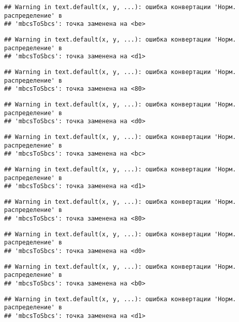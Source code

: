 \documentclass[
]{article}
\begin{document}
\begin{verbatim}
## Warning in text.default(x, y, ...): ошибка конвертации 'Норм. распределение' в
## 'mbcsToSbcs': точка заменена на <be>
\end{verbatim}

\begin{verbatim}
## Warning in text.default(x, y, ...): ошибка конвертации 'Норм. распределение' в
## 'mbcsToSbcs': точка заменена на <d1>
\end{verbatim}

\begin{verbatim}
## Warning in text.default(x, y, ...): ошибка конвертации 'Норм. распределение' в
## 'mbcsToSbcs': точка заменена на <80>
\end{verbatim}

\begin{verbatim}
## Warning in text.default(x, y, ...): ошибка конвертации 'Норм. распределение' в
## 'mbcsToSbcs': точка заменена на <d0>
\end{verbatim}

\begin{verbatim}
## Warning in text.default(x, y, ...): ошибка конвертации 'Норм. распределение' в
## 'mbcsToSbcs': точка заменена на <bc>
\end{verbatim}

\begin{verbatim}
## Warning in text.default(x, y, ...): ошибка конвертации 'Норм. распределение' в
## 'mbcsToSbcs': точка заменена на <d1>
\end{verbatim}

\begin{verbatim}
## Warning in text.default(x, y, ...): ошибка конвертации 'Норм. распределение' в
## 'mbcsToSbcs': точка заменена на <80>
\end{verbatim}

\begin{verbatim}
## Warning in text.default(x, y, ...): ошибка конвертации 'Норм. распределение' в
## 'mbcsToSbcs': точка заменена на <d0>
\end{verbatim}

\begin{verbatim}
## Warning in text.default(x, y, ...): ошибка конвертации 'Норм. распределение' в
## 'mbcsToSbcs': точка заменена на <b0>
\end{verbatim}

\begin{verbatim}
## Warning in text.default(x, y, ...): ошибка конвертации 'Норм. распределение' в
## 'mbcsToSbcs': точка заменена на <d1>
\end{verbatim}
\end{document}
